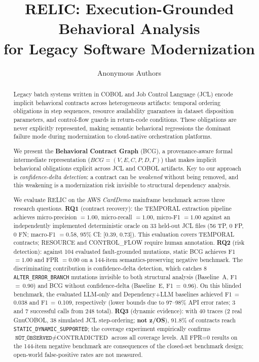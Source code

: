 \documentclass[sigconf,anonymous,review]{acmart}
\newcommand{\bcg}{\textsc{BCG}\xspace}
\newcommand{\system}{\textsc{RELIC}\xspace}
\newcommand{\carddemo}{\textit{CardDemo}\xspace}
\newcommand{\notobs}{\texttt{NOT\_OBSERVED}\xspace}
\newcommand{\supported}{\texttt{STATIC\_DYNAMIC\_SUPPORTED}\xspace}
\begin{document}
\title{RELIC: Execution-Grounded Behavioral Analysis\\for Legacy Software Modernization}

\author{Anonymous Authors}

\begin{abstract}
Legacy batch systems written in COBOL and Job Control Language (JCL) encode implicit
behavioral contracts across heterogeneous artifacts: temporal ordering obligations in
step sequences, resource availability guarantees in dataset disposition parameters,
and control-flow guards in return-code conditions.
These obligations are never explicitly represented, making semantic behavioral
regressions the dominant failure mode during modernization to cloud-native
orchestration platforms.

We present the \textbf{Behavioral Contract Graph} (\bcg), a provenance-aware formal
intermediate representation ($\mathit{BCG} = (V, E, C, P, D, \Gamma)$) that makes
implicit behavioral obligations explicit across JCL and COBOL artifacts.
Key to our approach is \emph{confidence-delta detection}: a contract can be
\emph{weakened} without being removed, and this weakening is a modernization risk
invisible to structural dependency analysis.

We evaluate \system on the AWS \carddemo mainframe benchmark across three research
questions.
\textbf{RQ1} (contract recovery): the TEMPORAL extraction pipeline achieves
micro-precision $= 1.00$, micro-recall $= 1.00$, micro-F1 $= 1.00$ against an
independently implemented deterministic oracle on 33 held-out JCL files
(56 TP, 0 FP, 0 FN; macro-F1 $= 0.58$, 95\% CI: [0.39, 0.73]).
This evaluation covers TEMPORAL contracts; RESOURCE and CONTROL\_FLOW require
human annotation.
\textbf{RQ2} (risk detection): against 104 evaluated fault-grounded mutations,
static \bcg achieves F1 $= 1.00$ and FPR $= 0.00$ on a 144-item
semantics-preserving negative benchmark.
The discriminating contribution is confidence-delta detection, which catches
8 \texttt{ALTER\_ERROR\_BRANCH} mutations invisible to both structural analysis
(Baseline~A, F1\,$=$\,0.90) and \bcg without confidence-delta (Baseline~E,
F1\,$=$\,0.96).
On this blinded benchmark, the evaluated LLM-only and Dependency+LLM baselines
achieved F1\,$=$\,0.038 and F1\,$=$\,0.109, respectively (lower bounds due to
97--98\% API error rates; 3 and 7 successful calls from 248 total).
\textbf{RQ3} (dynamic evidence): with 40 traces (2 real GnuCOBOL, 38 simulated
JCL step-ordering; \textbf{not z/OS}),
91.8\% of contracts reach \supported; the coverage experiment
empirically confirms $\notobs \neq \text{CONTRADICTED}$ across all coverage levels.
All FPR=0 results on the 144-item negative benchmark are consequences of the
closed-set benchmark design; open-world false-positive rates are not measured.
\end{abstract}
\end{document}
